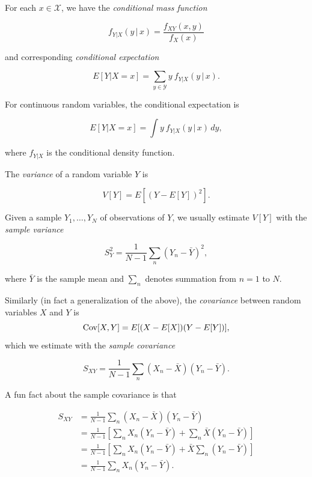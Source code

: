 \documentclass[12pt,oneside,openany]{book}
\begin{document}
For each \(x \in \mathcal{X}\), we have the \emph{conditional mass
function}

\begin{equation}
f_{Y|X}(y \,|\, x) = \frac{f_{XY}(x, y)}{f_X(x)}
\end{equation}

and corresponding \emph{conditional expectation}

\begin{equation}
E[Y | X = x]
= \sum_{y \in \mathcal{Y}} y \: f_{Y|X}(y \,|\, x).
\end{equation}

For continuous random variables, the conditional expectation is

\begin{equation}
E[Y | X = x]
= \int y \: f_{Y|X} (y \,|\, x) \, dy,
\end{equation}

where \(f_{Y|X}\) is the conditional density function.

The \emph{variance} of a random variable \(Y\) is

\begin{equation}
V[Y] = E[(Y - E[Y])^2].
\end{equation}

Given a sample \(Y_1, \ldots, Y_N\) of observations of \(Y\), we usually
estimate \(V[Y]\) with the \emph{sample variance}

\begin{equation}
S_Y^2 = \frac{1}{N-1} \sum_n (Y_n - \bar{Y})^2,
\end{equation}

where \(\bar{Y}\) is the sample mean and \(\sum_n\) denotes summation
from \(n = 1\) to \(N\).

Similarly (in fact a generalization of the above), the \emph{covariance}
between random variables \(X\) and \(Y\) is \[
\mathop{\rm Cov}\nolimits[X, Y] = E[(X - E[X]) (Y - E[Y])],
\] which we estimate with the \emph{sample covariance}

\begin{equation}
S_{XY} = \frac{1}{N-1} \sum_n (X_n - \bar{X}) (Y_n - \bar{Y}).
\end{equation}

A fun fact about the sample covariance is that

\begin{align}
S_{XY}
&= \frac{1}{N-1} \sum_n (X_n - \bar{X}) (Y_n - \bar{Y}) \\
&= \frac{1}{N-1} \left[ \sum_n X_n (Y_n - \bar{Y}) + \sum_n \bar{X} (Y_n - \bar{Y}) \right] \\
&= \frac{1}{N-1} \left[ \sum_n X_n (Y_n - \bar{Y}) + \bar{X} \sum_n (Y_n - \bar{Y}) \right] \\
&= \frac{1}{N-1} \sum_n X_n (Y_n - \bar{Y}).
\end{align}
\end{document}
